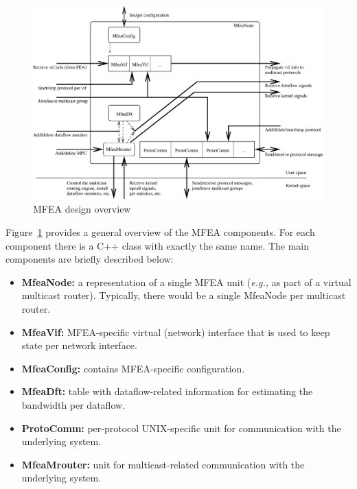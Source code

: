 \documentclass[11pt]{article}
\newcommand{\eg}{\emph{e.g.,}\xspace}
\begin{document}
\begin{figure}[htbp]
  \begin{center}
    \includegraphics[scale=0.5]{figs/mfea_design_overview}
    \caption{MFEA design overview}
    \label{fig:mfea_design_overview}
  \end{center}
\end{figure}

Figure~\ref{fig:mfea_design_overview} provides a general overview of the
MFEA components. For each component there is a C++ class with exactly
the same name. The main components are briefly described below:

\begin{itemize}

  \item {\bf MfeaNode:} a representation of a single MFEA unit
  (\eg as part of a virtual multicast router).
  Typically, there would be a single MfeaNode per multicast router.

  \item {\bf MfeaVif:} MFEA-specific virtual (network) interface that is used
  to keep state per network interface.

  \item {\bf MfeaConfig:} contains MFEA-specific configuration.

  \item {\bf MfeaDft:} table with dataflow-related information for
  estimating the bandwidth per dataflow.

  \item {\bf ProtoComm:} per-protocol UNIX-specific unit for
  communication with the underlying system.

  \item {\bf MfeaMrouter:} unit for multicast-related communication with
  the underlying system.

\end{itemize}
\end{document}
